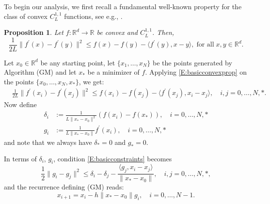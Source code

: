 \documentclass[12pt]{article}
\numberwithin{equation}{section}
\newtheorem{proposition}{Proposition}[section]
\theoremstyle{definition}
\theoremstyle{remark}
\def\real{\mathbb{R}}
\begin{document}
To  begin our analysis, we first recall a fundamental well-known property for the class of
convex $C^{1,1}_L$ functions, see e.g., \cite[Theorem~2.1.5]{nest-book-04}.

\begin{proposition}\label{prop:lip} Let $f:\real^d \to \real$ be convex and $C^{1,1}_L$. Then,
\begin{equation}\label{E:basicconvexprop}
    \frac{1}{2L} \|f^\prime(x)-f^\prime(y)\|^2 \leq f(x)-f(y)-\langle f^\prime(y), x-y\rangle, \;\mbox{for all}
    \; x,y\in \mathbb{R}^d.
\end{equation}
\end{proposition}

Let $x_0\in \real^d$ be any starting point, let $\{x_1,\dots,x_N \}$ be the points generated
by Algorithm (GM) and let $x_\ast$ be a minimizer of $f$. Applying \eqref{E:basicconvexprop}
on the points $\{x_0,\dots,x_N, x_\ast\}$, we get:
\begin{align}\label{E:basicconstraints}
    & \frac{1}{2L} \|f^\prime(x_i)-f^\prime(x_j)\|^2 \leq f(x_i)-f(x_j)-\langle f^\prime(x_j), x_i-x_j\rangle, \quad i,j=0,\dots,N,\ast.
\end{align}
Now define
\begin{align*}
    \delta_i &:= \frac{1}{L\|x_\ast-x_0\|^2}(f(x_i)-f(x_\ast)),\quad i=0,\dots,N, \ast \\
    g_i &:= \frac{1}{L\|x_\ast-x_0\|}f^\prime(x_i),\quad i=0,\dots,N, \ast
\end{align*}
and note that  we always have $\delta_\ast=0$ and $g_\ast=0$.

In terms of $\delta_i$, $g_i$,
condition \eqref{E:basicconstraints} becomes
\begin{equation}\label{carf}
    \frac{1}{2}\| g_i - g_j \| ^2 \leq \delta_i - \delta_j - \frac{\langle g_j, x_i-x_j
    \rangle}{\|x_\ast-x_0\|}, \quad i,j=0,\dots,N,\ast,
\end{equation}
and the recurrence defining (GM) reads:
$$
x_{i+1}=x_i - h \|x_\ast -x_0\| g_i, \quad i=0, \ldots , N-1 .
$$
\end{document}

